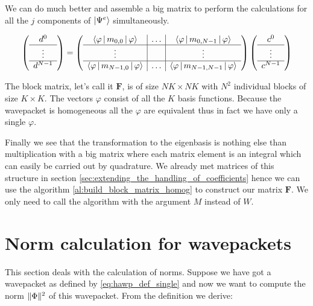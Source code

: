 We can do much better and assemble a big matrix to perform the calculations for
all the $j$ components of $\Ket{\Psi^e}$ simultaneously.

\begin{equation}
  \left(\begin{array}{c}
    d^0 \\
    \hline
    \vdots \\
    \hline
    d^{N-1}
  \end{array}\right)
  =
  \left(
  \begin{array}{c|c|c}
    \Braket{\varphi|m_{0,0}|\varphi} & \hdots & \Braket{\varphi|m_{0,N-1}|\varphi} \\
    \hline
    \vdots & {} & \vdots \\
    \hline
    \Braket{\varphi|m_{N-1,0}|\varphi} & \hdots & \Braket{\varphi|m_{N-1,N-1}|\varphi} \\
  \end{array}\right)
  \left(\begin{array}{c}
    c^0 \\
    \hline
    \vdots \\
    \hline
    c^{N-1}
  \end{array}\right)
\end{equation}

The block matrix, let's call it $\mathbf{F}$, is of size $N K \times N K$ with $N^2$ individual
blocks of size $K \times K$. The vectors $\varphi$ consist of all the $K$ basis
functions. Because the wavepacket is homogeneous all the $\varphi$ are equivalent
thus in fact we have only a single $\varphi$.

Finally we see that the transformation to the eigenbasis is nothing else than multiplication
with a big matrix where each matrix element is an integral which can easily be
carried out by quadrature. We already met matrices of this structure in section \ref{sec:extending_the_handling_of_coefficients}
hence we can use the algorithm \ref{al:build_block_matrix_homog} to construct
our matrix $\mathbf{F}$. We only need to call the algorithm with the argument $M$ instead of $W$.

\section{Norm calculation for wavepackets}

This section deals with the calculation of norms. Suppose we have got a wavepacket
as defined by \eqref{eq:hawp_def_single} and now we want to compute the norm
$\| \Phi \|^2$ of this wavepacket. From the definition we derive:

